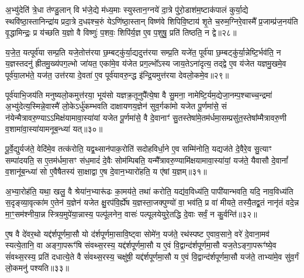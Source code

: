 अ॒भ्यु॑देति॑ त्रे॒धा त॑ण्डु॒लान् वि भ॑जे॒द्ये म॑ध्य॒माः स्युस्तान॒ग्नये॑ दा॒त्रे पु॑रो॒डाश॑म॒ष्टाक॑पालं कुर्या॒द्ये स्थवि॑ष्ठा॒स्तानिन्द्रा॑य प्रदा॒त्रे द॒धꣴश्च॒रुं ये\-ऽणि॑ष्ठा॒स्तान् विष्ण॑वे शिपिवि॒ष्टाय॑ शृ॒ते च॒रुम॒ग्निरे॒वास्मै᳚ प्र॒जाम्प्र॑ज॒नय॑ति वृ॒द्धामिन्द्रः॒ प्र य॑च्छति य॒ज्ञो वै विष्णुः॑ प॒शवः॒ शिपि॑र्य॒ज्ञ ए॒व प॒शुषु॒ प्रति॑ तिष्ठति॒ न द्वे॥२८॥

य॒जे॒त॒ यत्पूर्व॑या सम्प्र॒ति यजे॒तोत्त॑रया छ॒म्बट्कु॑र्या॒द्यदुत्त॑रया सम्प्र॒ति यजे॑त॒ पूर्व॑या छ॒म्बट्कु॑र्या॒न्नेष्टि॒र्भव॑ति॒ न य॒ज्ञस्तदनु॑ ह्रीतमु॒ख्य॑पग॒ल्भो जा॑यत॒ एका॑मे॒व य॑जेत प्रग॒ल्भो᳚\-ऽस्य जाय॒ते\-ऽना॑दृत्य॒ तद्द्वे ए॒व य॑जेत यज्ञमु॒खमे॒व पूर्व॑या॒लभ॑ते॒ यज॑त॒ उत्त॑रया दे॒वता॑ ए॒व पूर्व॑यावरु॒न्द्ध इ॑न्द्रि॒यमुत्त॑रया देवलो॒कमे॒व॥२९॥

पूर्व॑याभि॒जय॑ति मनुष्यलो॒कमुत्त॑रया॒ भूय॑सो यज्ञक्र॒तूनुपै᳚त्ये॒षा वै सु॒मना॒ नामेष्टि॒र्यम॒द्येजा॒नम्प॒श्चाच्च॒न्द्रमा॑ अ॒भ्यु॑देत्य॒स्मिन्ने॒वास्मै॑ लो॒के\-ऽर्धु॑कम्भवति दाक्षायणय॒ज्ञेन॑ सुव॒र्गका॑मो यजेत पू॒र्णमा॑से॒ सं न॑येन्मैत्रावरु॒ण्या\-ऽ\-ऽ\-मिक्ष॑यामावा॒स्या॑यां यजेत पू॒र्णमा॑से॒ वै दे॒वानाꣳ॑ सु॒तस्तेषा॑मे॒तम॑र्धमा॒सम्प्रसु॑त॒स्तेषा᳚म्मैत्रावरु॒णी व॒शामा॑वा॒स्या॑यामनूब॒न्ध्या॑ यत्॥३०॥

पू॒र्वे॒द्युर्यज॑ते॒ वेदि॑मे॒व तत्क॑रोति॒ यद्व॒थ्सान॑पाक॒रोति॑ सदोहविर्धा॒ने ए॒व सम्मि॑नोति॒ यद्यज॑ते दे॒वैरे॒व सु॒त्याꣳ सम्पा॑दयति॒ स ए॒तम॑र्धमा॒सꣳ स॑ध॒मादं॑ दे॒वैः सोम॑म्पिबति॒ यन्मै᳚त्रावरु॒ण्यामि॑क्षयामावा॒स्या॑यां॒ यज॑ते॒ यैवासौ दे॒वानां᳚ व॒शानू॑ब॒न्ध्या॑ सो ए॒वैषैतस्य॑ सा॒क्षाद्वा ए॒ष दे॒वान॒भ्यारो॑हति॒ य ए॑षां य॒ज्ञम्॥३१॥

अ॒भ्या॒रोह॑ति॒ यथा॒ खलु॒ वै श्रेया॑न॒भ्यारू॑ढः का॒मय॑ते॒ तथा॑ करोति॒ यद्य॑व॒विध्य॑ति॒ पापी॑यान्भवति॒ यदि॒ नाव॒विध्य॑ति स॒दृङ्व्या॒वृत्का॑म ए॒तेन॑ य॒ज्ञेन॑ यजेत क्षु॒रप॑वि॒र्\mbox{}ह्ये॑ष य॒ज्ञस्ता॒जक्पुण्यो॑ वा॒ भव॑ति॒ प्र वा॑ मीयते॒ तस्यै॒तद्व्र॒तं नानृ॑तं वदे॒न्न मा॒ꣳ॒सम॑श्नीया॒न्न स्त्रिय॒मुपे॑या॒न्नास्य॒ पल्पू॑लनेन॒ वासः॑ पल्पूलयेयुरे॒तद्धि दे॒वाः सर्वं॒ न कु॒र्वन्ति॑॥३२॥

{\anuvakamend[{च॒न्द्रमा॒ द्वे दे॑वलो॒कमे॒व यद्य॒ज्ञं प॑ल्पूलयेयु॒ष्षट्च॑॥५॥}]}

ए॒ष वै दे॑वर॒थो यद्द॑र्\mbox{}शपूर्णमा॒सौ यो द॑र्\mbox{}शपूर्णमा॒सावि॒ष्ट्वा सोमे॑न॒ यज॑ते॒ रथ॑स्पष्ट ए॒वाव॒साने॒ वरे॑ दे॒वाना॒मव॑ स्यत्ये॒तानि॒ वा अङ्गा॒परूꣳ॑षि संवथ्स॒रस्य॒ यद्द॑र्\mbox{}शपूर्णमा॒सौ य ए॒वं वि॒द्वान्द॑र्\mbox{}शपूर्णमा॒सौ यज॒ते\-ऽङ्गा॒परूꣳ॑ष्ये॒व सं॑वथ्स॒रस्य॒ प्रति॑ दधात्ये॒ते वै सं॑वथ्स॒रस्य॒ चक्षु॑षी॒ यद्द॑र्\mbox{}शपूर्णमा॒सौ य ए॒वं वि॒द्वान्द॑र्\mbox{}शपूर्णमा॒सौ यज॑ते॒ ताभ्या॑मे॒व सु॑व॒र्गं लो॒कमनु॑ पश्यति॥३३॥

